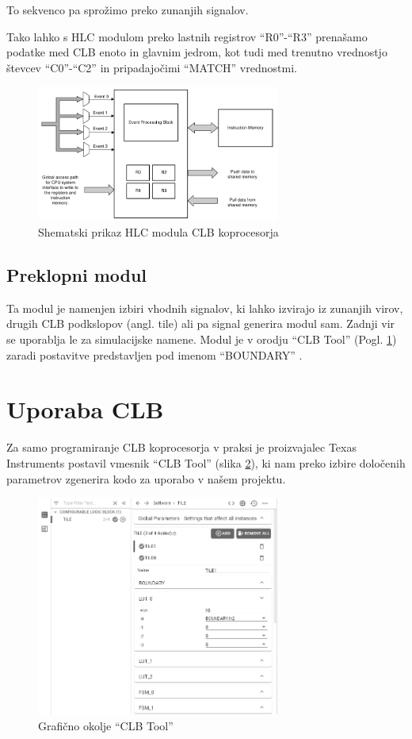 \documentclass[a4paper]{article}
\begin{document}
\begin{sloppypar}
To sekvenco pa sprožimo preko zunanjih signalov.

Tako lahko s HLC modulom preko lastnih registrov
``R0''-``R3'' \cite[Pogl.~26.4.6]{mcu-ref-manual} prenašamo podatke med CLB
enoto in glavnim jedrom, kot tudi med trenutno vrednostjo števcev ``C0''-``C2''
in pripadajočimi ``MATCH'' vrednostmi.

\begin{figure}[htb]
    \centerline{\includegraphics[width=8cm]{shema_hlc}}
    \caption{Shematski prikaz HLC modula CLB koprocesorja
             \cite[Pogl.~26.4.6]{mcu-ref-manual}}
    \label{fig:hlc} 
\end{figure}

\subsection{Preklopni modul}
Ta modul je namenjen izbiri vhodnih signalov, ki lahko izvirajo iz zunanjih
virov, drugih CLB podkslopov (angl. tile) ali pa signal generira modul sam.
Zadnji vir se uporablja le za simulacijske namene. Modul je v orodju ``CLB
Tool'' (Pogl. \ref{sec:clb_tool}) zaradi postavitve predstavljen pod imenom
``BOUNDARY'' \cite[Pogl.~3.3]{clb-user-guide}.


\section{Uporaba CLB}\label{sec:clb_tool}
Za samo programiranje CLB koprocesorja v praksi je proizvajalec Texas
Instruments postavil vmesnik ``CLB Tool'' (slika \ref{fig:clbtool}),
ki nam preko izbire določenih parametrov zgenerira kodo za uporabo v našem
projektu.

\begin{figure}[htb]
    \centerline{\includegraphics[width=8cm]{clbtool}}
    \caption{Grafično okolje ``CLB Tool''}
    \label{fig:clbtool} 
\end{figure} 


\end{sloppypar}
\end{document}
